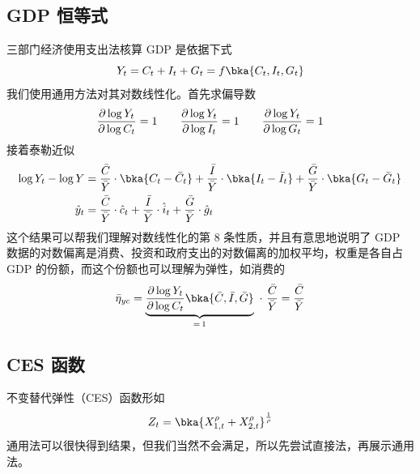 \subsection{GDP 恒等式}\label{subsec:exGDP}

三部门经济使用支出法核算 GDP 是依据下式
\begin{equation}
    Y_t=C_t+I_t+G_t=f\bka{C_t,I_t,G_t}\notag
\end{equation}
我们使用通用方法对其对数线性化。首先求偏导数
\begin{equation}
    \dfrac{\partial\log Y_t}{\partial\log C_t}=1 \qquad \dfrac{\partial\log Y_t}{\partial\log I_t}=1 \qquad \dfrac{\partial\log Y_t}{\partial\log G_t}=1\notag
\end{equation}
接着泰勒近似
\begin{align}
    \log Y_t-\log Y&=\dfrac{\bar C}{\bar Y}\cdot \bka{C_t-\bar C_t} + \dfrac{\bar I}{\bar Y}\cdot \bka{I_t-\bar I_t} + \dfrac{\bar G}{\bar Y}\cdot\bka{G_t-\bar G_t}\notag\\
    \hat y_t &=\frac{\bar C}{\bar Y}\cdot \hat c_t + \frac{\bar I}{\bar Y}\cdot \hat i_t + \frac{\bar G}{\bar Y}\cdot \hat g_t\label{eq:LogLineGDP}
\end{align}
这个结果可以帮我们理解对数线性化的第 8 条性质，并且有意思地说明了 GDP 数据的对数偏离是消费、投资和政府支出的对数偏离的加权平均，权重是各自占 GDP 的份额，而这个份额也可以理解为弹性，如消费的
\begin{equation}
    \bar\eta_{yc}=\underbrace{\dfrac{\partial\log Y_t}{\partial\log C_t}\bka{\bar C,\bar I,\bar G}}_{=\,1} \ \cdot \ \dfrac{\bar C}{\bar Y}=\dfrac{\bar C}{\bar Y}
\end{equation}

\subsection{CES 函数}\label{subsec:exCES}

不变替代弹性（CES）函数形如
\begin{equation}
    Z_t=\bka{X_{1,t}^{\rho}+X_{2,t}^{\rho}}^{\frac1\rho}\label{eq:CESExample}
\end{equation}
通用法可以很快得到结果，但我们当然不会满足，所以先尝试直接法，再展示通用法。


